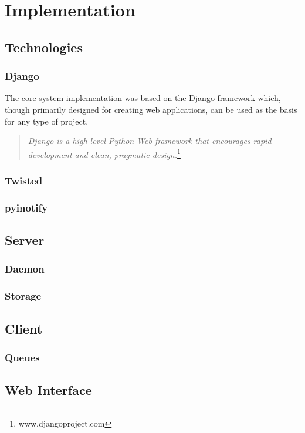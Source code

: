 \chapter{Implementation}

\section{Technologies}

\subsection{Django}

The core system implementation was based on the Django framework which, though
primarily designed for creating web applications, can be used as the basis for
any type of project.

\begin{quote}
    \emph{Django is a high-level Python Web framework that encourages rapid
    development and clean, pragmatic design.}\footnote{www.djangoproject.com}
\end{quote}

\subsection{Twisted}

\subsection{pyinotify}

\section{Server}

\subsection{Daemon}

\subsection{Storage}

\section{Client}

\subsection{Queues}

\section{Web Interface}

